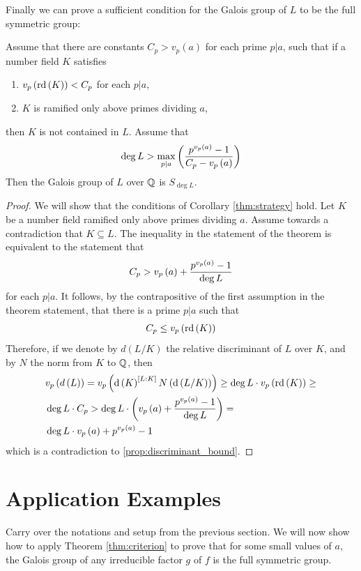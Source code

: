 \documentclass[../main.tex]{subfiles}
\begin{document}
Finally we can prove a sufficient condition for the Galois group of $L$ to be the full symmetric group:
\begin{thm}
  \label{thm:criterion}
  Assume that there are constants $C_p > v_p\left( a \right)$ for each prime $p|a$, such that if a number field $K$ satisfies 
  \begin{enumerate}
    \item $v_p\left( \operatorname{\rm rd}\left( K \right) \right) < C_p$ for each $p|a$,
    \item $K$ is ramified only above primes dividing $a$,
  \end{enumerate} 
  then $K$ is not contained in $L$.
  Assume that
  \[
    \deg L > \max_{p| a}\left( \frac{p^{v_p\left( a \right)} - 1}{C_p - v_p\left( a \right)} \right)
  \] 
  Then the Galois group of $L$ over $\mathbb{Q}$ is $S_{\deg L}$.
\end{thm}
\begin{proof}
  We will show that the conditions of Corollary \ref{thm:strategy} hold.
  Let $K$ be a number field ramified only above primes dividing $a$.
  Assume towards a contradiction that $K \subseteq L$.
  The inequality in the statement of the theorem is equivalent to the statement that 
  \[
    C_p > v_p\left( a \right) + \frac{p^{v_p\left( a \right)} - 1}{\deg L}
  \]
  for each $p|a$.
  It follows, by the contrapositive of the first assumption in the theorem statement, that there is a prime $p|a$ such that 
  \[
    C_p \leq v_p\left( \operatorname{\rm rd}\left( K \right) \right) 
  \] 
  Therefore, if we denote by $d\left( L/K \right)$ the relative discriminant of $L$ over $K$, and by $N$ the norm from $K$ to $\mathbb{Q}$, then
  \begin{align*}
    & v_p\left( d\left( L \right) \right) = 
    v_p\left( \operatorname{\rm d}\left( K \right)^{\left[ L:K \right]} N\left( \operatorname{\rm d}\left( L/K \right) \right) \right) \geq \deg L \cdot v_p\left( \operatorname{\rm rd}\left( K \right) \right) \geq \\
    & \deg L \cdot C_p > \deg L \cdot \left( v_p\left( a \right) + \frac{p^{v_p\left( a \right)} - 1}{\deg L} \right) = \\
    & \deg L \cdot v_p\left( a \right) + p^{v_p\left( a \right)} - 1 
  \end{align*}
  which is a contradiction to \cref{prop:discriminant_bound}.
\end{proof}

\section{Application Examples}
Carry over the notations and setup from the previous section.
We will now show how to apply Theorem \ref{thm:criterion} to prove that for some small values of $a$, the Galois group of any irreducible factor $g$ of $f$ is the full symmetric group.
\end{document}
